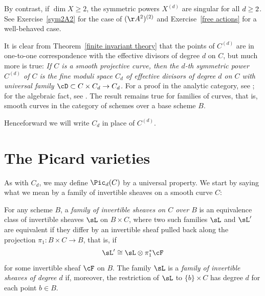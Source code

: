 By contrast, if $\dim X \geq 2$, the symmetric powers $X^{(d)}$ are
singular for all $d \geq \nobreak 2$.
See Exercise~\ref{sym2A2} for the case of $(\AA^2)^{(2)}$ and Exercise~\ref{free actions} for a well-behaved case.
\vspace{3pt}

\begin{fact}\label{universal property of symmetric power}
It is clear from Theorem~\ref{finite invariant theory} that the points
of $C^{(d)}$ are in one-to-one correspondence with the effective
divisors of degree $d$ on $C$, but much more is true:
\smallbreak
{\it
If $C$ is a smooth projective curve, then the $d$-th
symmetric power
%
$C^{(d)}$ of $C$ is the
fine moduli space
%
$C_d$ of effective divisors of degree $d$ on $C$ with
universal family
%
%
$\cD\subset C\times C_d \to C_d$.
}
\smallbreak
For a proof in the analytic category, see \cite[p.\,164]{ACGH};
for the algebraic fact, see \cite[Remark 9.3.9]{Kleiman-PicardScheme}.
The result remains true for
families of curves,
%
 that is, smooth curves in
the category of schemes over a base scheme $B$.
\end{fact}

Henceforward we will write $C_d$ in place of $C^{(d)}$.

\section{The Picard varieties}\label{Picard section}

As with $C_d$, we may define $\Pic_d(C)$ by a universal property. We start by saying what we mean by a family of invertible sheaves on a smooth curve $C$:

\begin{definition}
For any scheme $B$, a \emph{family of invertible sheaves on $C$ over $B$}
%
is an equivalence class of invertible sheaves $\sL$ on $B\times C$,
where two such
 families $\sL$ and $\sL'$ are equivalent if they differ by an invertible sheaf pulled back along the projection $\pi_1: B\times C \to B$, that is, if
 $$
 \sL' \cong \sL \otimes \pi_1^*\cF
 $$
for some invertible sheaf $\cF$ on $B$.
The family $\sL$  is a \emph{family of invertible sheaves of degree $d$} if, moreover, the restriction of $\sL$
 to $\{b\}\times C$ has degree $d$ for each point $b\in B$.
 \end{definition}

